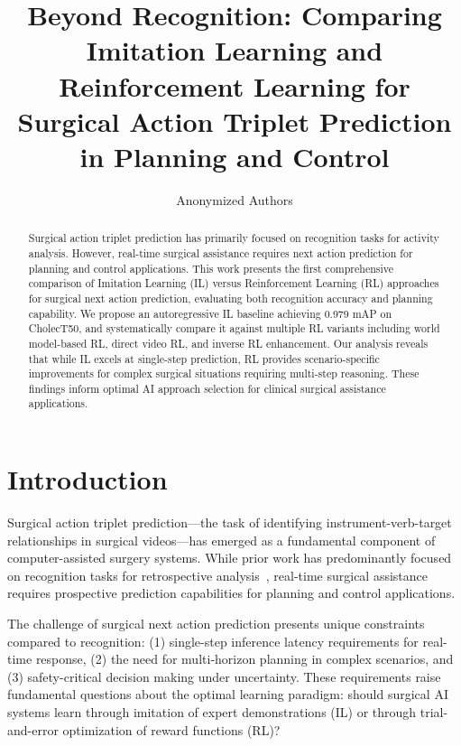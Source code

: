 \documentclass[runningheads]{llncs}
\author{Anonymized Authors}
\institute{Anonymized Affiliations \\
    \email{email@anonymized.com}}
\begin{document}
\title{Beyond Recognition: Comparing Imitation Learning and Reinforcement Learning for Surgical Action Triplet Prediction in Planning and Control}

\maketitle

\begin{abstract}
Surgical action triplet prediction has primarily focused on recognition tasks for activity analysis. However, real-time surgical assistance requires next action prediction for planning and control applications. This work presents the first comprehensive comparison of Imitation Learning (IL) versus Reinforcement Learning (RL) approaches for surgical next action prediction, evaluating both recognition accuracy and planning capability. We propose an autoregressive IL baseline achieving 0.979 mAP on CholecT50, and systematically compare it against multiple RL variants including world model-based RL, direct video RL, and inverse RL enhancement. Our analysis reveals that while IL excels at single-step prediction, RL provides scenario-specific improvements for complex surgical situations requiring multi-step reasoning. These findings inform optimal AI approach selection for clinical surgical assistance applications.

\end{abstract}

\section{Introduction}

Surgical action triplet prediction—the task of identifying instrument-verb-target relationships in surgical videos—has emerged as a fundamental component of computer-assisted surgery systems. While prior work has predominantly focused on recognition tasks for retrospective analysis~\cite{ref_cholect50,ref_rendezvous}, real-time surgical assistance requires prospective prediction capabilities for planning and control applications.

The challenge of surgical next action prediction presents unique constraints compared to recognition: (1) single-step inference latency requirements for real-time response, (2) the need for multi-horizon planning in complex scenarios, and (3) safety-critical decision making under uncertainty. These requirements raise fundamental questions about the optimal learning paradigm: should surgical AI systems learn through imitation of expert demonstrations (IL) or through trial-and-error optimization of reward functions (RL)?
\end{document}
